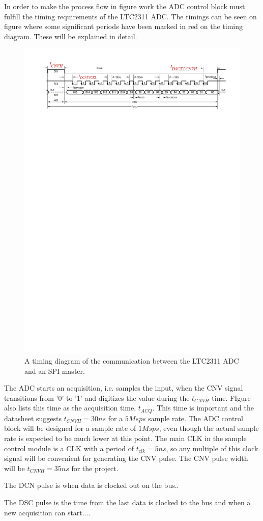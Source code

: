 In order to make the process flow in figure  work the ADC control block must fulfill the timing requirements of the LTC2311 ADC. The timings can be seen on figure  where some significant periods have been marked in red on the timing diagram. These will be explained in detail. 

\begin{figure}[H]
    \centering
    \includegraphics[clip, trim=0 675 0 0, width=1\textwidth]{Sections/7_SystemDesign/Figures/7_2_8_LTC2311_TIMING.pdf}
    \caption{A timing diagram of the communication between the LTC2311 ADC and an SPI master.}
    \label{fig:7_2_8_LTC2311_TIMING}
\end{figure}

The ADC starts an acquisition, i.e. samples the input, when the CNV signal transitions from '0' to '1' and digitizes the value during the $t_{CNVH}$ time. FIgure  also lists this time as the acquisition time, $t_{ACQ}$. This time is important and the datasheet suggests $t_{CNVH} = 30 ns$ for a $5M sps$ sample rate. The ADC control block will be designed for a sample rate of $1 Msps$, even though the actual sample rate is expected to be much lower at this point. The main CLK in the sample control module is a  CLK with a period of $t_{clk} = 5 ns$, so any multiple of this clock signal will be convenient for generating the CNV pulse. The CNV pulse width will be $t_{CNVH} = 35 ns$ for the project.

The DCN pulse is when data is clocked out on the bus..

The DSC pulse is the time from the last data is clocked to the bus and when a new acquisition can start....
